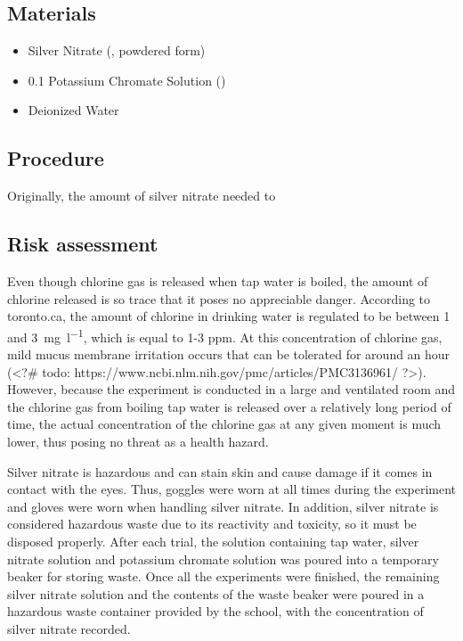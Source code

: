 \documentclass[11pt]{article}
\begin{document}
\subsection{Materials}

\begin{itemize}
	\item Silver Nitrate (, powdered form)
	\item 0.1 \mpl Potassium Chromate Solution ()
	\item Deionized Water
\end{itemize}

\subsection{Procedure}


Originally, the amount of silver nitrate needed to

\subsection{Risk assessment}

Even though chlorine gas is released when tap water is boiled, the amount of chlorine released is so trace that it poses no appreciable danger. According to toronto.ca, the amount of chlorine in drinking water is regulated to be between 1 and \SI{3}{\mg\per\litre}, which is equal to 1-3 ppm. At this concentration of chlorine gas, mild mucus membrane irritation occurs that can be tolerated for around an hour (<?# todo: https://www.ncbi.nlm.nih.gov/pmc/articles/PMC3136961/ ?>). However, because the experiment is conducted in a large and ventilated room and the chlorine gas from boiling tap water is released over a relatively long period of time, the actual concentration of the chlorine gas at any given moment is much lower, thus posing no threat as a health hazard.

Silver nitrate is hazardous and can stain skin and cause damage if it comes in contact with the eyes. Thus, goggles were worn at all times during the experiment and gloves were worn when handling silver nitrate. In addition, silver nitrate is considered hazardous waste due to its reactivity and toxicity, so it must be disposed properly. After each trial, the solution containing tap water, silver nitrate solution and potassium chromate solution was poured into a temporary beaker for storing waste. Once all the experiments were finished, the remaining silver nitrate solution and the contents of the waste beaker were poured in a hazardous waste container provided by the school, with the concentration of silver nitrate recorded.
\end{document}
